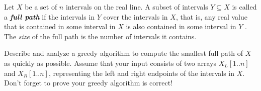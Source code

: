 \documentclass[a4paper, justified]{tufte-handout}
\begin{document}

\begin{ot}[Intervals]

	Let $X$ be a set of $n$ intervals on the real line.
	A subset of intervals $Y\subseteq X$ is called a \textit{\textbf{full path}} if the intervals in $Y$ cover the intervals in $X$, that is, any real value that is contained in some interval in $X$ is also contained in some interval in $Y$ . The \textit{size} of the full path is the number of intervals it contains.


	Describe and analyze a greedy algorithm to compute the smallest full path of $X$ as quickly as possible.
	Assume that your input consists of two arrays $X_L \left[1..n\right]$ and $X_R \left[1..n\right]$, representing the left and right endpoints of the intervals in $X$. Don't forget to prove your greedy algorithm is correct!
\end{ot}



% 




\beginfb

% 
% 
\end{document}

